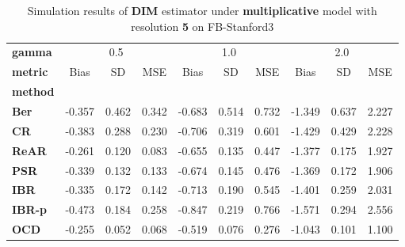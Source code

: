 \begin{table}
\centering
\caption{Simulation results of \textbf{DIM} estimator under \textbf{multiplicative} model with resolution \textbf{5} on FB-Stanford3}
\begin{tabular}{lccccccccc}
\toprule
\textbf{gamma} & \multicolumn{3}{c}{0.5} & \multicolumn{3}{c}{1.0} & \multicolumn{3}{c}{2.0} \\
\textbf{metric} &   Bias &     SD &    MSE &   Bias &     SD &    MSE &   Bias &     SD &    MSE \\
\textbf{method} &        &        &        &        &        &        &        &        &        \\
\midrule
\textbf{Ber} & -0.357 &  0.462 &  0.342 & -0.683 &  0.514 &  0.732 & -1.349 &  0.637 &  2.227 \\
\textbf{CR} & -0.383 &  0.288 &  0.230 & -0.706 &  0.319 &  0.601 & -1.429 &  0.429 &  2.228 \\
\textbf{ReAR} & -0.261 &  0.120 &  0.083 & -0.655 &  0.135 &  0.447 & -1.377 &  0.175 &  1.927 \\
\textbf{PSR} & -0.339 &  0.132 &  0.133 & -0.674 &  0.145 &  0.476 & -1.369 &  0.172 &  1.906 \\
\textbf{IBR} & -0.335 &  0.172 &  0.142 & -0.713 &  0.190 &  0.545 & -1.401 &  0.259 &  2.031 \\
\textbf{IBR-p} & -0.473 &  0.184 &  0.258 & -0.847 &  0.219 &  0.766 & -1.571 &  0.294 &  2.556 \\
\textbf{OCD} & -0.255 &  0.052 &  0.068 & -0.519 &  0.076 &  0.276 & -1.043 &  0.101 &  1.100 \\
\bottomrule
\end{tabular}
\end{table}
